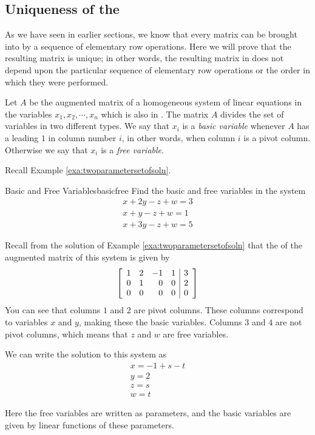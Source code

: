 \subsection{Uniqueness of the\RREF}

As we have seen in earlier sections, we know that every matrix can be brought into \rref \;by a sequence of elementary row operations. Here we will prove that the resulting matrix is unique; in other words, the resulting matrix in \rref\;does not depend upon the particular sequence of elementary row operations or the order in which they were performed. 

Let $A$ be the augmented matrix of a homogeneous system of linear
equations in the variables $x_1, x_2, \cdots, x_n$ which is also in
\rref. The matrix $A$ divides the set of variables in two different
types. We say that $x_i$ is a {\em basic variable}     whenever $A$ has
a leading $1$ in column number $i$, in other words, when column $i$ is
a pivot column. Otherwise we say that $x_i$ is a {\em free
variable\em}. 

Recall Example \ref{exa:twoparametersetofsoln}.

\begin{example}{Basic and Free Variables}{basicfree}
Find the basic and free variables in the system
\[
\begin{array}{c}
x+2y-z+w=3 \\
x+y-z+w=1 \\
x+3y-z+w=5
\end{array}
\]
\end{example}

\begin{solution}
Recall from the solution of Example \ref{exa:twoparametersetofsoln} that the \ef \;of the augmented matrix of this system is given by
\[
\left[
\begin{array}{rrrr|r}
1 & 2 & -1 & 1 & 3 \\
0 & 1 & 0 & 0 & 2 \\
0 & 0 & 0 & 0 & 0
\end{array}
\right]  
\]
You can see that columns $1$ and $2$ are pivot columns. These columns correspond to variables $x$ and $y$, making these the basic variables. Columns $3$ and $4$ are not pivot columns, which means that $z$ and $w$ are free variables.

We can write the solution to this system as 
\[
\begin{array}{c}
x=-1+s-t \\
y=2 \\
z=s \\
w=t
\end{array}
\]

Here the free variables are written as parameters, and the basic variables are given by linear functions of these parameters. 
\end{solution}

